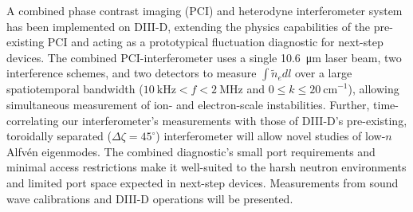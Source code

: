 %
%
%

A combined phase contrast imaging (PCI) and heterodyne interferometer system
has been implemented on DIII-D, extending the physics capabilities of
the pre-existing PCI and
acting as a prototypical fluctuation diagnostic for next-step devices.
The combined PCI-interferometer uses a single \SI{10.6}{\micro\meter}
laser beam, two interference schemes, and two detectors to measure
$\int \tilde{n}_e dl$ over a large spatiotemporal bandwidth
($\SI{10}{\kilo\hertz} < f < \SI{2}{\mega\hertz}$ and
$0 \leq k \leq \SI{20}{\centi\meter}^{-1}$),
allowing simultaneous measurement of ion- and electron-scale instabilities.
Further, time-correlating our interferometer's measurements with
those of DIII-D's pre-existing, toroidally separated
($\Delta \zeta = 45^{\circ}$) interferometer will allow
novel studies of low-$n$ Alfv\'{e}n eigenmodes.
The combined diagnostic's small port requirements and
minimal access restrictions make it well-suited to
the harsh neutron environments and limited port space
expected in next-step devices.
Measurements from sound wave calibrations and DIII-D operations
will be presented.
